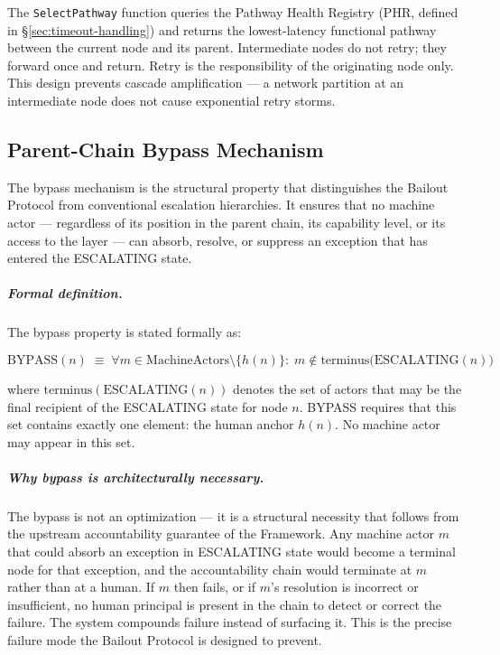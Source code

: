The \texttt{SelectPathway} function queries the Pathway Health Registry (PHR, defined in \S\ref{sec:timeout-handling}) and returns the lowest-latency functional pathway between the current node and its parent. Intermediate nodes do not retry; they forward once and return. Retry is the responsibility of the originating node only. This design prevents cascade amplification — a network partition at an intermediate node does not cause exponential retry storms.

\subsection{Parent-Chain Bypass Mechanism}\label{sec:bypass}

The bypass mechanism is the structural property that distinguishes the Bailout Protocol from conventional escalation hierarchies. It ensures that no machine actor — regardless of its position in the parent chain, its capability level, or its access to the \fact{} layer — can absorb, resolve, or suppress an exception that has entered the ESCALATING state.

\subparagraph{Formal definition.} The bypass property is stated formally as:

\begin{equation}
\text{BYPASS}(n) \;\equiv\; \forall m \in \text{MachineActors} \setminus \{h(n)\}:\; m \notin \text{terminus}\bigl(\text{ESCALATING}(n)\bigr) \tag{BP}\label{eq:bypass-property}
\end{equation}

where $\text{terminus}(\text{ESCALATING}(n))$ denotes the set of actors that may be the final recipient of the ESCALATING state for node $n$. BYPASS requires that this set contains exactly one element: the human anchor $h(n)$. No machine actor may appear in this set.

\subparagraph{Why bypass is architecturally necessary.} The bypass is not an optimization — it is a structural necessity that follows from the upstream accountability guarantee of the \bxthree{} Framework. Any machine actor $m$ that could absorb an exception in ESCALATING state would become a terminal node for that exception, and the accountability chain would terminate at $m$ rather than at a human. If $m$ then fails, or if $m$'s resolution is incorrect or insufficient, no human principal is present in the chain to detect or correct the failure. The system compounds failure instead of surfacing it. This is the precise failure mode the Bailout Protocol is designed to prevent.

